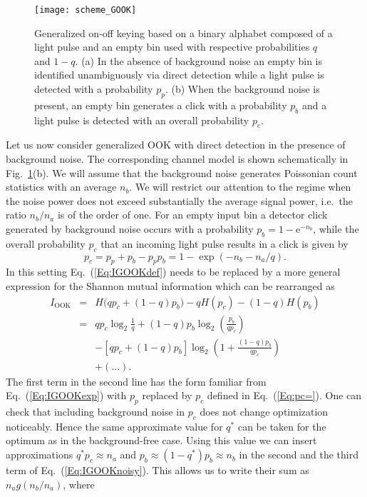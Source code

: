 \documentclass[conference]{IEEEtran}
\newcommand{\optval}[1]{#1^\ast}
\newcommand{\ookpulseprob}{q}
\newcommand{\Eul}{\mathrm{e}}
\begin{document}
\begin{figure}
\begin{centering}
\texttt{[image: scheme\_GOOK]}
\caption{Generalized on-off keying based on a binary alphabet composed of a light pulse and an empty bin used with respective probabilities $q$ and $1-q$. (a) In the absence of background noise an empty bin is identified unambiguously via direct detection while a light pulse is detected with a probability $p_p$. (b) When the background noise is present, an empty bin generates a click with a probability $p_b$ and a light pulse is detected with an overall probability $p_c$.}
\label{fig:scheme_GOOK}
\end{centering}
\end{figure}


Let us now consider generalized OOK with direct detection in the presence of background noise. The corresponding channel model is shown schematically in Fig.~\ref{fig:scheme_GOOK}(b). We will assume that the background noise generates Poissonian count statistics with an average $n_b$. We will restrict our attention to the regime when the noise power does not exceed substantially the average signal power, i.e.\ the ratio $n_b/n_a$ is of the order of one. For an empty input bin a detector click generated by background noise occurs with a probability $p_b = 1 - \Eul^{-n_b}$, while the overall probability $p_c$ that an incoming light pulse results in a click is given by
\begin{equation}
p_c = p_p + p_b - p_p p_b = 1 - \exp(- n_b -n_a/\ookpulseprob ).
\label{Eq:pc=}
\end{equation}
In this setting Eq.~(\ref{Eq:IGOOKdef}) needs to be replaced by a more general expression for the Shannon mutual information which can be rearranged as
\begin{eqnarray}
I_{\text{OOK}} & = & H\bigl(\ookpulseprob p_c + (1-\ookpulseprob)p_b\bigr) - \ookpulseprob H(p_c) - (1-\ookpulseprob) H(p_b) \nonumber \\
&  = & \ookpulseprob p_c \log_2\frac{1}{\ookpulseprob}
+ (1-\ookpulseprob)p_b \log_2 \left(  \frac{p_b}{\ookpulseprob p_c} \right)
 \nonumber \\
& & - [\ookpulseprob p_c + (1-\ookpulseprob)p_b] \log_2 \left( 1 + \frac{(1-\ookpulseprob) p_b}{\ookpulseprob p_c} \right) \nonumber \\
& &  + (\ldots).
\label{Eq:IGOOKnoisy}
\end{eqnarray}
The first term in the second line has the form familiar from Eq.~(\ref{Eq:IGOOKexp}) with $p_p$ replaced by $p_c$ defined in Eq.~(\ref{Eq:pc=}). One can check that including background noise in $p_c$ does not change optimization noticeably. Hence the same approximate value for $\optval{\ookpulseprob}$ can be taken for the optimum as in the background-free case. Using this value we can insert approximations $\optval{\ookpulseprob} p_c \approx n_a$ and $p_b \approx (1-\optval{\ookpulseprob}) p_b \approx n_b$ in the second and the third term of Eq.~(\ref{Eq:IGOOKnoisy}). This allows us to write their sum as $n_a g(n_b/n_a)$, where
\end{document}
